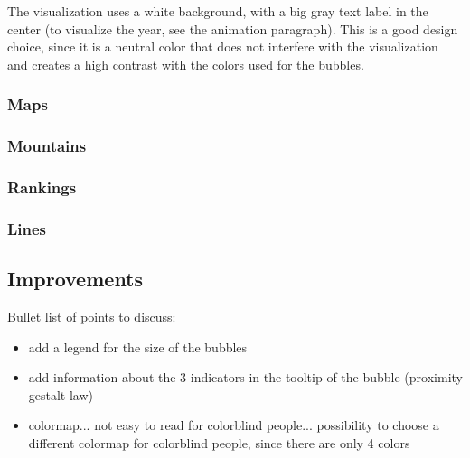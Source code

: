 The visualization uses a white background, with a big gray text label in the center (to visualize the year, see the animation paragraph).
This is a good design choice, since it is a neutral color that does not interfere with the visualization and creates a high contrast with the colors used for the bubbles.



\subsubsection{Maps}

\subsubsection{Mountains}

\subsubsection{Rankings}

\subsubsection{Lines}


\subsection{Improvements}
Bullet list of points to discuss:
\begin{itemize}
    \item add a legend for the size of the bubbles
    \item add information about the 3 indicators in the tooltip of the bubble (proximity gestalt law)

    \item colormap... not easy to read for colorblind people... possibility to choose a different colormap for colorblind people, since there are only 4 colors
\end{itemize}
